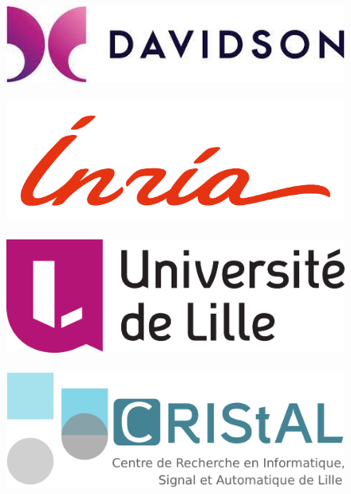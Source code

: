 \thispagestyle{empty}



\begin{figure}[!ht]
    \includegraphics[width=.24\linewidth, keepaspectratio]{Figs/logo-davidson.jpeg}\,
    \includegraphics[width=.24\linewidth]{Figs/logo-inria}\,
    \includegraphics[width=.24\linewidth,trim={0 3em 0 0 }]{Figs/logo-univ-lille}\,
    \includegraphics[width=.24\linewidth]{Figs/logo-cristal}\,

\end{figure}
